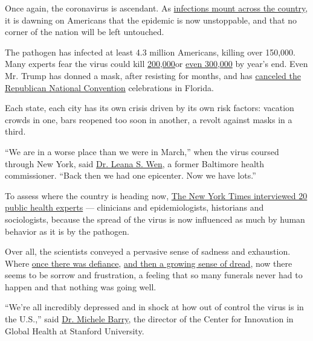 Once again, the coronavirus is ascendant. As
\href{https://www.nytimes.com/interactive/2020/us/coronavirus-us-cases.html}{infections
mount across the country}, it is dawning on Americans that the epidemic
is now unstoppable, and that no corner of the nation will be left
untouched.

The pathogen has infected at least 4.3 million Americans, killing over
150,000. Many experts fear the virus could kill
\href{https://www.forbes.com/sites/mattperez/2020/07/07/imhe-model-projects-208255-us-deaths-by-november-but-estimate-falls-sharply-if-mask-use-increases/\#3c8ee9616f2e}{200,000}or
\href{https://www.cnbc.com/2020/07/22/dr-scott-gottlieb-us-coronavirus-deaths-may-hit-300000-by-year-end.html}{even
300,000} by year's end. Even Mr. Trump has donned a mask, after
resisting for months, and has
\href{https://www.nytimes.com/2020/07/23/us/politics/jacksonville-rnc.html}{canceled
the Republican National Convention} celebrations in Florida.

Each state, each city has its own crisis driven by its own risk factors:
vacation crowds in one, bars reopened too soon in another, a revolt
against masks in a third.

``We are in a worse place than we were in March,'' when the virus
coursed through New York, said
\href{https://www.gwumc.edu/smhs/facultydirectory/profile.cfm?empName=Leana\%20Wen\&FacID=2073685428}{Dr.
Leana S. Wen}, a former Baltimore health commissioner. ``Back then we
had one epicenter. Now we have lots.''

To assess where the country is heading now,
\href{https://www.nytimes.com/2020/07/29/health/coronavirus-future-america.html}{The
New York Times interviewed 20 public health experts} --- clinicians and
epidemiologists, historians and sociologists, because the spread of the
virus is now influenced as much by human behavior as it is by the
pathogen.

Over all, the scientists conveyed a pervasive sense of sadness and
exhaustion. Where
\href{https://www.nytimes.com/2020/03/22/health/coronavirus-restrictions-us.html}{once
there was defiance},
\href{https://www.nytimes.com/2020/04/18/health/coronavirus-america-future.html}{and
then a growing sense of dread}, now there seems to be sorrow and
frustration, a feeling that so many funerals never had to happen and
that nothing was going well.

``We're all incredibly depressed and in shock at how out of control the
virus is in the U.S.,'' said
\href{https://profiles.stanford.edu/michele-barry}{Dr. Michele Barry},
the director of the Center for Innovation in Global Health at Stanford
University.

